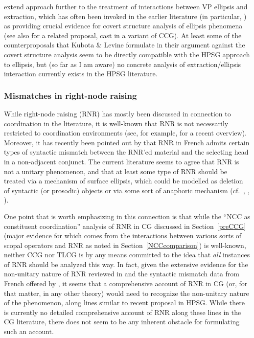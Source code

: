 \documentclass[output=paper
                ,modfonts
                ,nonflat
	        ,collection
	        ,collectionchapter
	        ,collectiontoclongg
 	        ,biblatex
                ,babelshorthands
                ,newtxmath
                ,draftmode
                ,colorlinks, citecolor=brown
]{./langsci/langscibook}
\begin{document}
\citet[Chapter 8]{KubotaLevineBook} extend 
 approach further to the treatment of
interactions between  VP ellipsis and extraction, which has often been
invoked in the earlier literature (in particular, \citealt{kennedy2003})
as providing crucial evidence for  covert structure analysis of
ellipsis phenomena (see also \citealt{jacobson14ellipsis} for a related
proposal, cast in a variant of CCG).
At least some of the counterproposals that Kubota \& Levine formulate
in their argument against the covert structure analysis seem to be
directly compatible with the HPSG approach to ellipsis,  but (so far
as I am aware)  no concrete analysis of extraction/ellipsis
interaction currently exists in the HPSG literature.




\subsubsection{Mismatches in right-node raising}

While right-node raising (RNR) has mostly been discussed in connection to coordination in
the literature, it is well-known that RNR is not necessarily
restricted to coordination environments (see, for example, \citealt{wilder-ellipsis-handbook}
for a recent overview). Moreover, it
has recently been pointed out by \citet{ACS2016a-u} that RNR in French
admits certain types of syntactic mismatch between the RNR'ed material
and the selecting head in a non-adjacent conjunct.
The current literature seems to agree that RNR is not a unitary
phenomenon, and that at least some type of RNR should be treated via a
mechanism of surface ellipsis, which could be modelled as deletion of
syntactic (or prosodic) objects or via some sort of anaphoric
mechanism (cf.\ ,
\citealt{Chaves2014a-u}, \citealt{kubota-levine-pseudo}).

One point that is worth emphasizing in this connection is that
while the ``NCC as constituent coordination'' analysis of RNR in CG
discussed in Section~\ref{preCCG} (major evidence for which comes from the
interactions between various sorts of scopal operators and RNR as
noted in Section~\ref{NCCcomparison}) is well-known, neither CCG nor TLCG is by
any means committed to the idea that \emph{all} instances of RNR should be
analyzed this way.
In fact, given the extensive evidence for the non-unitary nature of
RNR reviewed in \citet{Chaves2014a-u} and the syntactic mismatch data from
French offered by \citet{ACS2016a-u},  it seems
that a comprehensive account of RNR in CG (or, for that matter, in any
other theory) would need to recognize the
non-unitary nature of the phenomenon, along lines similar to
 recent proposal in HPSG. While there is currently no
detailed comprehensive account of RNR along these lines in the
CG literature, there does not  seem to be any inherent 
obstacle for formulating such an account.
\end{document}
